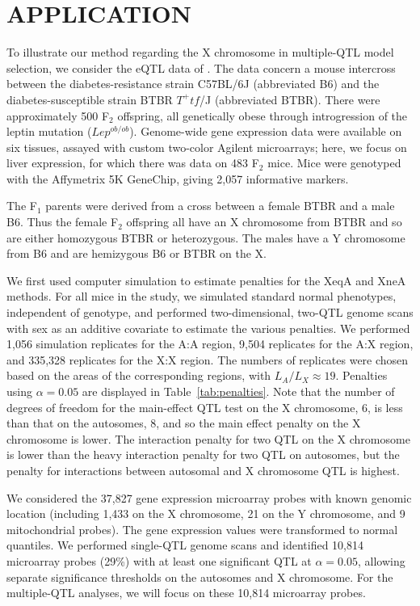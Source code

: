 \documentclass[12pt,letterpaper]{article}
\begin{document}
\clearpage
\section*{APPLICATION}

To illustrate our method regarding the X chromosome in multiple-QTL
model selection, we consider the eQTL data of \citet{Tian2016}. The
data concern a mouse intercross between the diabetes-resistance strain
C57BL/6J (abbreviated B6) and the diabetes-susceptible strain
BTBR $T^{+} tf$/J (abbreviated BTBR). There
were approximately 500 F$_2$ offspring, all genetically obese through
introgression of the leptin mutation ($Lep^{ob/ob}$). Genome-wide gene
expression data were available on six tissues, assayed with custom
two-color Agilent microarrays; here, we focus on liver expression, for
which there was data on 483 F$_2$ mice.
Mice were genotyped with the Affymetrix 5K GeneChip, giving 2,057
informative markers.

The F$_1$ parents were derived from a cross between a female BTBR and
a male B6. Thus the female F$_2$ offspring all have an X chromosome
from BTBR and so are either homozygous BTBR or heterozygous. The males
have a Y chromosome from B6 and are hemizygous B6 or BTBR on the X.

We first used computer simulation to estimate penalties for the XeqA
and XneA methods. For all mice in the study, we simulated standard
normal phenotypes, independent of genotype, and performed
two-dimensional, two-QTL genome scans with sex as an additive
covariate to estimate the various penalties. We performed 1,056
simulation replicates for the A:A region, 9,504 replicates for the A:X
region, and 335,328 replicates for the X:X region. The numbers of
replicates were chosen based on the areas of the corresponding
regions, with $L_A/L_X \approx 19$. Penalties using $\alpha=0.05$ are
displayed in Table~\ref{tab:penalties}.
Note that the number of degrees of freedom for the main-effect QTL test on
the X chromosome, $6$, is less than that on the autosomes, $8$, and so the
main effect penalty on the X chromosome is lower. The interaction
penalty for two QTL on the X chromosome is lower than the heavy
interaction penalty for two QTL on autosomes, but the
penalty for interactions between autosomal and X chromosome QTL is
highest.

We considered the 37,827 gene expression microarray probes with known
genomic location (including 1,433 on the X chromosome, 21 on the Y
chromosome, and 9 mitochondrial probes). The gene
expression values were transformed to normal quantiles. We performed single-QTL genome
scans and identified 10,814 microarray probes (29\%) with at least one
significant QTL at $\alpha=0.05$, allowing separate significance
thresholds on the autosomes and X chromosome. For the multiple-QTL
analyses, we will focus on these 10,814 microarray probes.
\end{document}
